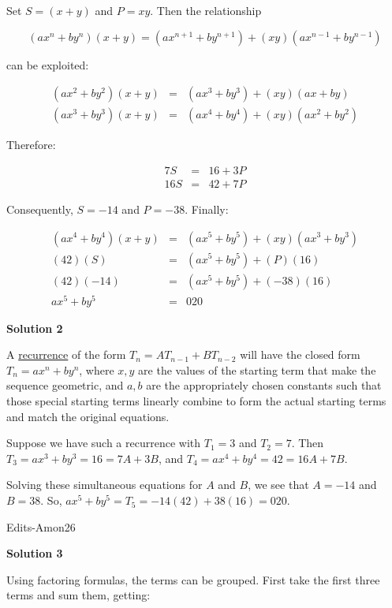 \begin{enumerate}
Set $S = (x + y)$ and $P = xy$. Then the relationship

 
 \[(ax^n + by^n)(x + y) = (ax^{n + 1} + by^{n + 1}) + (xy)(ax^{n - 1} + by^{n - 1})\]

 can be exploited:

 
 \begin{eqnarray*}(ax^2 + by^2)(x + y) & = & (ax^3 + by^3) + (xy)(ax + by) \\ (ax^3 + by^3)(x + y) & = & (ax^4 + by^4) + (xy)(ax^2 + by^2)\end{eqnarray*}

 Therefore:

 
 \begin{eqnarray*}7S & = & 16 + 3P \\ 16S & = & 42 + 7P\end{eqnarray*}

 Consequently, $S = - 14$ and $P = - 38$. Finally:

 
 \begin{eqnarray*}(ax^4 + by^4)(x + y) & = & (ax^5 + by^5) + (xy)(ax^3 + by^3) \\ (42)(S) & = & (ax^5 + by^5) + (P)(16) \\ (42)( - 14) & = & (ax^5 + by^5) + ( - 38)(16) \\ ax^5 + by^5 & = & \boxed{020}\end{eqnarray*}




\textbf{Solution 2}

A \href{https://artofproblemsolving.com/wiki/index.php?title=Linear\_recurrence}{ recurrence} of the form $T_n=AT_{n-1}+BT_{n-2}$ will have the closed form $T_n=ax^n+by^n$, where $x,y$ are the values of the starting term that make the sequence geometric, and $a,b$ are the appropriately chosen constants such that those special starting terms linearly combine to form the actual starting terms and match the original equations.

 Suppose we have such a recurrence with $T_1=3$ and $T_2=7$. Then $T_3=ax^3+by^3=16=7A+3B$, and $T_4=ax^4+by^4=42=16A+7B$. 

 Solving these simultaneous equations for $A$ and $B$, we see that $A=-14$ and $B=38$. So, $ax^5+by^5=T_5=-14(42)+38(16)= \boxed{020}$.

 Edits-Amon26

 



\textbf{Solution 3}

Using factoring formulas, the terms can be grouped. First take the first three terms and sum them, getting:


\end{enumerate}

